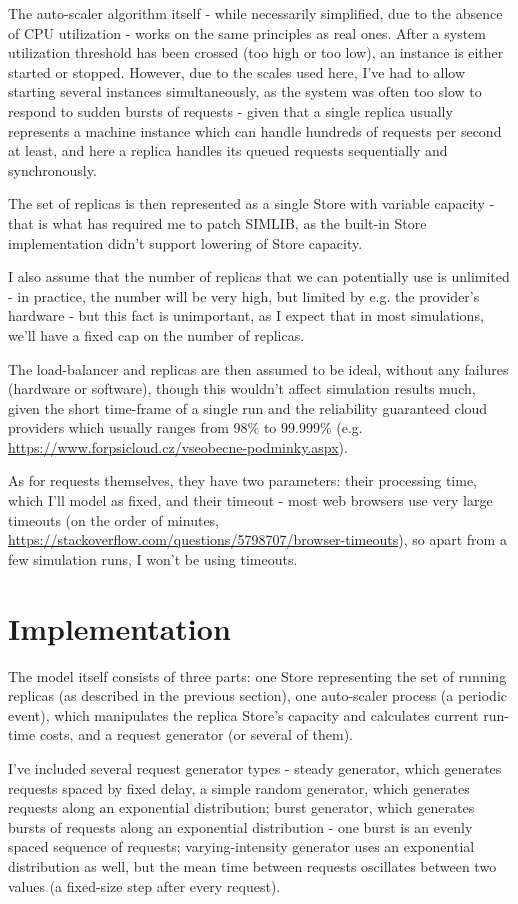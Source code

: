 \documentclass{scrartcl}
\begin{document}
The auto-scaler algorithm itself - while necessarily simplified, due to the
absence of CPU utilization - works on the same principles as real ones. After a
system utilization threshold has been crossed (too high or too low), an instance
is either started or stopped. However, due to the scales used here, I've had to
allow starting several instances simultaneously, as the system was often too
slow to respond to sudden bursts of requests - given that a single replica
usually represents a machine instance which can handle hundreds of requests per
second at least, and here a replica handles its queued requests sequentially and
synchronously.

The set of replicas is then represented as a single Store with variable
capacity - that is what has required me to patch SIMLIB, as the built-in Store
implementation didn't support lowering of Store capacity.

I also assume that the number of replicas that we can potentially use is
unlimited - in practice, the number will be very high, but limited by e.g. the
provider's hardware - but this fact is unimportant, as I expect that in most
simulations, we'll have a fixed cap on the number of replicas.

The load-balancer and replicas are then assumed to be ideal, without any
failures (hardware or software), though this wouldn't affect simulation results
much, given the short time-frame of a single run and the reliability guaranteed
cloud providers which usually ranges from 98\% to 99.999\%
(e.g. \url{https://www.forpsicloud.cz/vseobecne-podminky.aspx}).

As for requests themselves, they have two parameters: their processing time,
which I'll model as fixed, and their timeout - most web browsers use very large
timeouts (on the order of minutes,
\url{https://stackoverflow.com/questions/5798707/browser-timeouts}), so apart from a few
simulation runs, I won't be using timeouts.

\section{Implementation}
\label{sec-4}
The model itself consists of three parts: one Store representing the set of
running replicas (as described in the previous section), one auto-scaler process
(a periodic event), which manipulates the replica Store's capacity and
calculates current run-time costs, and a request generator (or several of them).

I've included several request generator types - steady generator, which
generates requests spaced by fixed delay, a simple random generator, which
generates requests along an exponential distribution; burst generator, which
generates bursts of requests along an exponential distribution - one burst is an
evenly spaced sequence of requests; varying-intensity generator uses an
exponential distribution as well, but the mean time between requests oscillates
between two values (a fixed-size step after every request).
\end{document}
